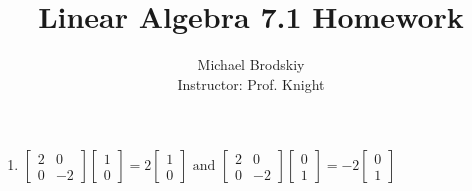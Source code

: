\documentclass[12pt]{article}
\title{Linear Algebra 7.1 Homework}
\date{}
\author{Michael Brodskiy\\ \small Instructor: Prof. Knight}
\begin{document}
\maketitle

\begin{enumerate}

    \begin{center}
      \underline{1-5 odd, 9, 12, 15-27 odd, 41, 47, 60, 78}
    \end{center}

  \item $\begin{bmatrix} 2 & 0\\ 0 & -2\end{bmatrix}\begin{bmatrix} 1\\0\end{bmatrix}=2\begin{bmatrix} 1\\0\end{bmatrix}\text{ and }\begin{bmatrix} 2 & 0\\ 0 & -2 \end{bmatrix}\begin{bmatrix} 0\\1 \end{bmatrix}=-2\begin{bmatrix} 0\\1\end{bmatrix}$

    \setcounter{enumi}{2}


\end{enumerate}
\end{document}
